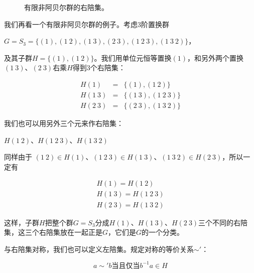 \documentclass{article}
\begin{document}
\begin{figure}[htbp]
\centering
{}
\caption{有限非阿贝尔群的右陪集。}
\label{fig:right-cosets-S3}
\end{figure}

我们再看一个有限非阿贝尔群的例子。考虑3阶置换群

$G = S_3 = \{(1), (1\ 2), (1\ 3), (2\ 3), (1\ 2\ 3), (1\ 3\ 2)\}$，

及其子群$H = \{(1), (1\ 2)\}$。我们用单位元恒等置换$(1)$，和另外两个置换$(1\ 3)$、$(2\ 3)$右乘$H$得到3个右陪集：

\[
\begin{array}{rcl}
H(1) & = & \{(1), (1\ 2)\} \\
H(1\ 3) & = & \{(1\ 3), (1\ 2\ 3)\} \\
H(2\ 3) & = & \{(2\ 3), (1\ 3\ 2)\}
\end{array}
\]

我们也可以用另外三个元来作右陪集：

$H(1\ 2)$、$H(1\ 2\ 3)$、$H(1\ 3\ 2)$

同样由于
$(1\ 2) \in H(1)$、$(1\ 2\ 3) \in H(1\ 3)$、$(1\ 3\ 2) \in H(2\ 3)$，所以一定有

\[
\begin{array}{l}
H(1) = H(1\ 2) \\
H(1\ 3) = H(1\ 2\ 3) \\
H(2\ 3) = H(1\ 3\ 2)
\end{array}
\]

这样，子群$H$把整个群$G = S_3$分成$H(1)$、$H(1\ 3)$、$H(2\ 3)$三个不同的右陪集，这三个右陪集放在一起正是$G$，它们是$G$的一个分类。

与右陪集对称，我们也可以定义左陪集。规定对称的等价关系$\sim'$：

\[
a \sim' b \text{当且仅当} b^{-1}a \in H
\]
\end{document}

